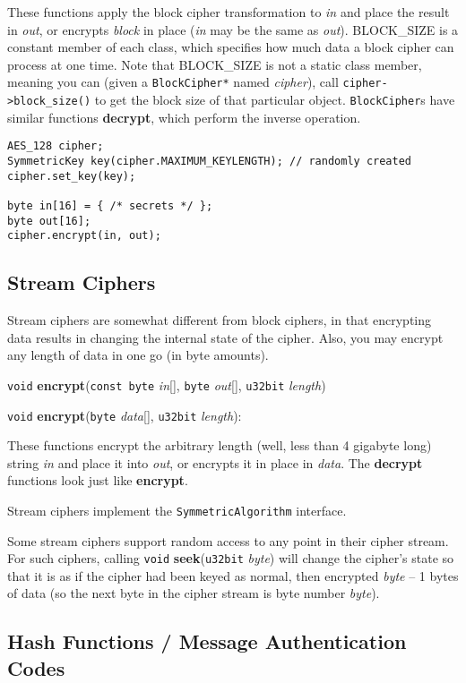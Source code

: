 \documentclass{article}
\newcommand{\function}[1]{\textbf{#1}}
\newcommand{\type}[1]{\texttt{#1}}
\renewcommand{\arg}[1]{\textsl{#1}}
\begin{document}
These functions apply the block cipher transformation to \arg{in} and
place the result in \arg{out}, or encrypts \arg{block} in place
(\arg{in} may be the same as \arg{out}). BLOCK\_SIZE is a constant
member of each class, which specifies how much data a block cipher can
process at one time. Note that BLOCK\_SIZE is not a static class
member, meaning you can (given a \type{BlockCipher*} named
\arg{cipher}), call \verb|cipher->block_size()| to get the block size
of that particular object. \type{BlockCipher}s have similar functions
\function{decrypt}, which perform the inverse operation.

\begin{verbatim}
AES_128 cipher;
SymmetricKey key(cipher.MAXIMUM_KEYLENGTH); // randomly created
cipher.set_key(key);

byte in[16] = { /* secrets */ };
byte out[16];
cipher.encrypt(in, out);
\end{verbatim}

\subsection{Stream Ciphers}

Stream ciphers are somewhat different from block ciphers, in that encrypting
data results in changing the internal state of the cipher. Also, you may
encrypt any length of data in one go (in byte amounts).

\noindent
\type{void} \function{encrypt}(\type{const byte} \arg{in}[], \type{byte}
\arg{out}[], \type{u32bit} \arg{length})

\noindent
\type{void} \function{encrypt}(\type{byte} \arg{data}[], \type{u32bit}
\arg{length}):

These functions encrypt the arbitrary length (well, less than 4 gigabyte long)
string \arg{in} and place it into \arg{out}, or encrypts it in place in
\arg{data}. The \function{decrypt} functions look just like
\function{encrypt}.

Stream ciphers implement the \type{SymmetricAlgorithm} interface.

Some stream ciphers support random access to any point in their cipher
stream. For such ciphers, calling \type{void} \function{seek}(\type{u32bit}
\arg{byte}) will change the cipher's state so that it is as if the cipher had been
keyed as normal, then encrypted \arg{byte} -- 1 bytes of data (so the next byte
in the cipher stream is byte number \arg{byte}).

\subsection{Hash Functions / Message Authentication Codes}
\end{document}
